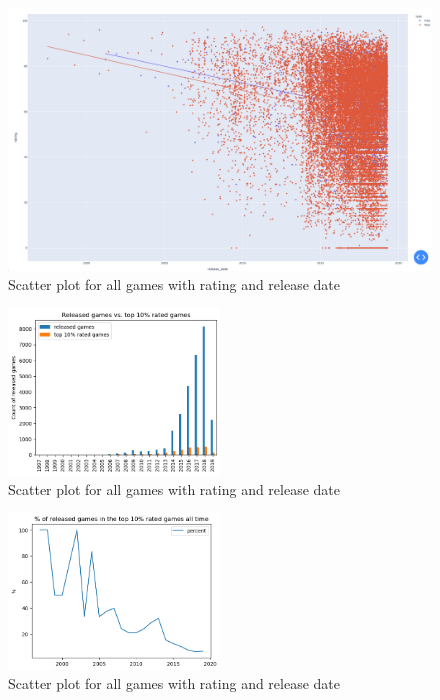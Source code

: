 \documentclass[11pt]{article}
\begin{document}
\begin{figure}
    \centering
    \includegraphics[width=1\textwidth]{graphics/insight2_graph1.png}
    \caption{Scatter plot for all games with rating and release date}
    \label{fig:insight2_1}
\end{figure}

\begin{figure}
    \centering
    \includegraphics[width=0.5\textwidth]{graphics/insight2_graph2.png}
    \caption{Scatter plot for all games with rating and release date}
    \label{fig:insight2_2}
\end{figure}

\begin{figure}
    \centering
    \includegraphics[width=0.5\textwidth]{graphics/insight2_graph3.png}
    \caption{Scatter plot for all games with rating and release date}
    \label{fig:insight2_3}
\end{figure}
\end{document}
